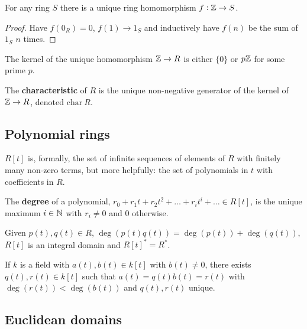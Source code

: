 \documentclass{report}
\begin{document}
\begin{lemma}
    For any ring $S$ there is a unique ring homomorphism $f:\mathbb{Z}\rightarrow S$.
    \begin{proof}
        Have $f(0_R)=0$, $f(1)\rightarrow 1_S$ and inductively have $f(n)$ be the sum of $1_S$ $n$ times.
    \end{proof}
\end{lemma}

\begin{lemma}
    The kernel of the unique homomorphism $\mathbb{Z}\rightarrow R$ is either $\{0\}$ or $p\mathbb{Z}$ for some prime $p$.
\end{lemma}

\begin{definition}[Characteristic]
    The \textbf{characteristic} of $R$ is the unique non-negative generator of the kernel of $\mathbb{Z}\rightarrow R$, denoted $\text{char}\ R$.
\end{definition}

\subsection{Polynomial rings}

\begin{definition}
    $R[t]$ is, formally, the set of infinite sequences of elements of $R$ with finitely many non-zero terms, but more helpfully: the set of polynomials in $t$ with coefficients in $R$.
\end{definition}

\begin{definition}
    The \textbf{degree} of a polynomial, $r_0 + r_1t + r_2t^2 + \ldots + r_i t^i + \ldots \in R[t]$, is the unique maximum $i\in\mathbb{N}$ with $r_i\neq 0$ and $0$ otherwise.
\end{definition}

\begin{lemma}
    Given $p(t),q(t)\in R$, $\deg(p(t)q(t))=\deg(p(t))+\deg(q(t))$, $R[t]$ is an integral domain and $R[t]^* = R^*$.
\end{lemma}

\begin{theorem}
    If $k$ is a field with $a(t),b(t)\in k[t]$ with $b(t)\neq 0$, there exists $q(t),r(t)\in k[t]$ such that $a(t)=q(t)b(t)=r(t)$ with $\deg(r(t))<\deg(b(t))$ and $q(t),r(t)$ unique.
\end{theorem}


\subsection{Euclidean domains}
\end{document}
